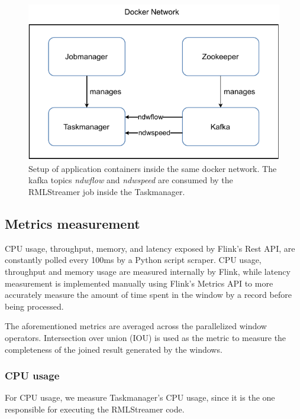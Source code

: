 \begin{figure}[htpb]
    \centering
    \includegraphics[width=\columnwidth]{fig/docker_setup.pdf}
    \caption[Setup of application containers inside the same docker network.]{ 
Setup of application containers inside the same docker network.
The kafka topics \emph{ndwflow} and \emph{ndwspeed} are consumed by the 
RMLStreamer job inside the Taskmanager.}
    \label{fig:docker_setup}
\end{figure}

\subsection{Metrics measurement}%
\label{sub:Metrics measurement}

CPU usage, throughput, memory, and latency exposed 
by Flink's Rest API, are constantly polled every 100ms by a 
Python script scraper.
CPU usage, throughput 
and memory usage are measured internally by Flink,
while latency measurement 
is implemented manually using Flink's Metrics API to more accurately measure the amount of 
time spent in the window by a record before being processed. 

The aforementioned metrics are averaged across the parallelized window operators.
Intersection over union (IOU) is used as the metric to measure the completeness
of the joined result generated by the windows.  


\subsubsection{CPU usage}%
\label{ssub:CPU usage}
For CPU usage, we measure Taskmanager's CPU usage, since it is 
the one responsible for executing the RMLStreamer code. 

